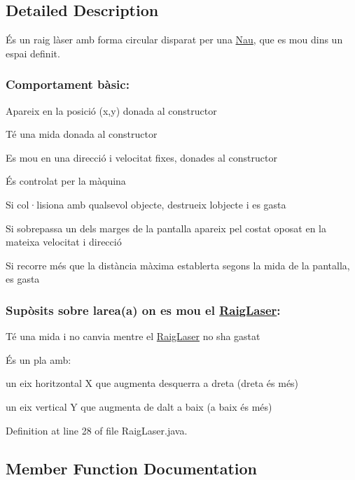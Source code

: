 \subsection{Detailed Description}
És un raig làser amb forma circular disparat per una \hyperlink{class_nau}{Nau}, que es mou dins un espai definit. 

\subsubsection*{Comportament bàsic\+: }


\begin{DoxyItemize}
\item Apareix en la posició (x,y) donada al constructor
\item Té una mida donada al constructor
\item Es mou en una direcció i velocitat fixes, donades al constructor
\item És controlat per la màquina
\item Si col·lisiona amb qualsevol objecte, destrueix l\textquotesingle{}objecte i es gasta
\item Si sobrepassa un dels marges de la pantalla apareix pel costat oposat en la mateixa velocitat i direcció
\item Si recorre més que la distància màxima establerta segons la mida de la pantalla, es gasta
\end{DoxyItemize}

\subsubsection*{Supòsits sobre l\textquotesingle{}area(a) on es mou el \hyperlink{class_raig_laser}{Raig\+Laser}\+: }

Té una mida i no canvia mentre el \hyperlink{class_raig_laser}{Raig\+Laser} no s\textquotesingle{}ha gastat

És un pla amb\+:
\begin{DoxyItemize}
\item un eix horitzontal X que augmenta d\textquotesingle{}esquerra a dreta (dreta és més)
\item un eix vertical Y que augmenta de dalt a baix (a baix és més) 
\end{DoxyItemize}

Definition at line 28 of file Raig\+Laser.\+java.



\subsection{Member Function Documentation}
\hypertarget{class_raig_laser_ac5b68f8063e239ae947a7ed728614799}{}
